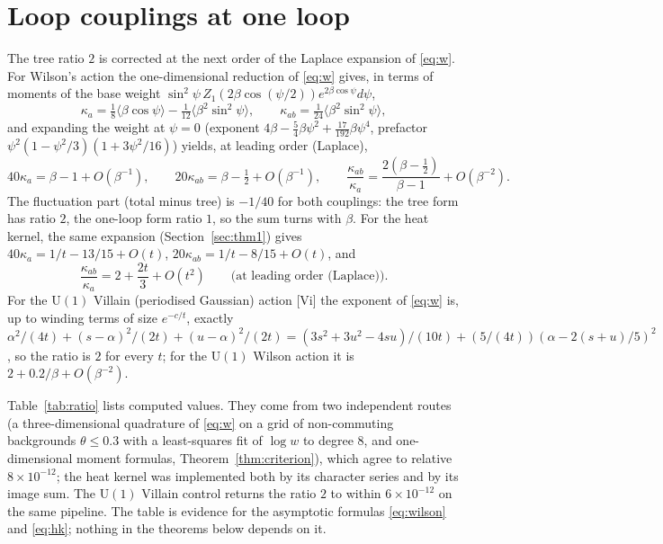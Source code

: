 \documentclass[11pt,a4paper]{article}
\theoremstyle{definition}
\theoremstyle{remark}
\begin{document}
\section{Loop couplings at one loop}\label{sec:oneloop}

The tree ratio $2$ is corrected at the next order of the Laplace expansion of \eqref{eq:w}.
For Wilson's action the one-dimensional reduction of \eqref{eq:w} gives, in terms of moments of the base weight $\sin^2\psi\,Z_1(2\beta\cos(\psi/2))e^{2\beta\cos\psi}d\psi$,
\[
\kappa_a=\tfrac18\langle\beta\cos\psi\rangle-\tfrac1{12}\langle\beta^2\sin^2\psi\rangle,\qquad \kappa_{ab}=\tfrac1{24}\langle\beta^2\sin^2\psi\rangle ,
\]
and expanding the weight at $\psi=0$ (exponent $4\beta-\tfrac54\beta\psi^2+\tfrac{17}{192}\beta\psi^4$, prefactor $\psi^2(1-\psi^2/3)(1+3\psi^2/16)$) yields, at leading order (Laplace),
\begin{equation}\label{eq:wilson}
40\kappa_a=\beta-1+O(\beta^{-1}),\qquad 20\kappa_{ab}=\beta-\tfrac12+O(\beta^{-1}),\qquad \frac{\kappa_{ab}}{\kappa_a}=\frac{2(\beta-\frac12)}{\beta-1}+O(\beta^{-2}).
\end{equation}
The fluctuation part (total minus tree) is $-1/40$ for both couplings: the tree form has ratio $2$, the one-loop form ratio $1$, so the sum turns with $\beta$.
For the heat kernel, the same expansion (Section~\ref{sec:thm1}) gives $40\kappa_a=1/t-13/15+O(t)$, $20\kappa_{ab}=1/t-8/15+O(t)$, and
\begin{equation}\label{eq:hk}
\frac{\kappa_{ab}}{\kappa_a}=2+\frac{2t}{3}+O(t^2)\qquad\text{(at leading order (Laplace))}.
\end{equation}
For the $\mathrm{U}(1)$ Villain (periodised Gaussian) action [Vi] the exponent of \eqref{eq:w} is, up to winding terms of size $e^{-c/t}$, exactly
$\alpha^2/(4t)+(s-\alpha)^2/(2t)+(u-\alpha)^2/(2t)=(3s^2+3u^2-4su)/(10t)+(5/(4t))(\alpha-2(s+u)/5)^2$,
so the ratio is $2$ for every $t$; for the $\mathrm{U}(1)$ Wilson action it is $2+0.2/\beta+O(\beta^{-2})$.

Table~\ref{tab:ratio} lists computed values.
They come from two independent routes (a three-dimensional quadrature of \eqref{eq:w} on a grid of non-commuting backgrounds $\theta\le0.3$ with a least-squares fit of $\log w$ to degree $8$, and one-dimensional moment formulas, Theorem~\ref{thm:criterion}), which agree to relative $8\times10^{-12}$; the heat kernel was implemented both by its character series and by its image sum.
The $\mathrm{U}(1)$ Villain control returns the ratio $2$ to within $6\times10^{-12}$ on the same pipeline.
The table is evidence for the asymptotic formulas \eqref{eq:wilson} and \eqref{eq:hk}; nothing in the theorems below depends on it.
\end{document}
